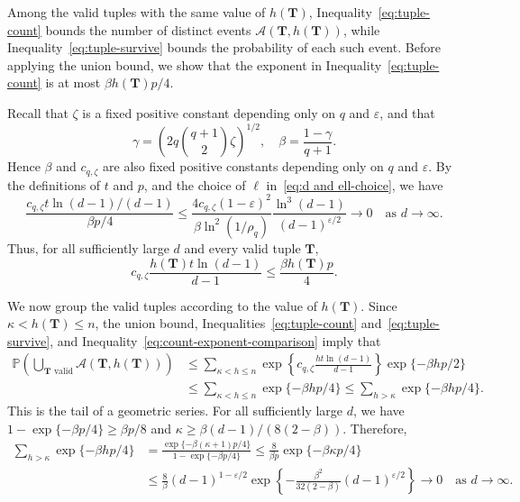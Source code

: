\documentclass[12pt]{article}
\numberwithin{equation}{section}
\theoremstyle{definition}
\newcommand{\Prob}{\mathbb{P}}
\begin{document}
Among the valid tuples with the same value of $h(\mathbf T)$,
Inequality~\eqref{eq:tuple-count} bounds the number of distinct events
$\mathcal A(\mathbf T,h(\mathbf T))$, while
Inequality~\eqref{eq:tuple-survive} bounds the probability of each such
event. Before applying the union bound, we show that the exponent in
Inequality~\eqref{eq:tuple-count} is at most
$\beta h(\mathbf T)p/4$.

Recall that $\zeta$ is a fixed positive constant depending only on $q$ and
$\varepsilon$, and that
\[
 \gamma=\left(2q\binom{q+1}{2}\zeta\right)^{1/2},
 \quad
 \beta=\frac{1-\gamma}{q+1}.
\]
Hence $\beta$ and $c_{q,\zeta}$ are also fixed positive constants depending
only on $q$ and $\varepsilon$. By the definitions of $t$ and $p$, and the
choice of $\ell$ in~\eqref{eq:d and ell-choice}, we have
\[
 \frac{c_{q,\zeta}t\ln(d-1)/(d-1)}{\beta p/4}
 \leq
 \frac{4c_{q,\zeta}(1-\varepsilon)^2}
 {\beta\ln^2(1/\rho_q)}
 \frac{\ln^3(d-1)}{(d-1)^{\varepsilon/2}}
 \longrightarrow 0
 \quad\text{as }d\to\infty.
\]
Thus, for all sufficiently large $d$ and every valid tuple $\mathbf T$,
\begin{equation}\label{eq:count-exponent-comparison}
 c_{q,\zeta}\frac{h(\mathbf T)t\ln(d-1)}{d-1}
 \leq\frac{\beta h(\mathbf T)p}{4}.
\end{equation}

We now group the valid tuples according to the value of $h(\mathbf T)$.
Since $\kappa<h(\mathbf T)\leq n$, the union bound,
Inequalities~\eqref{eq:tuple-count} and~\eqref{eq:tuple-survive}, and
Inequality~\eqref{eq:count-exponent-comparison} imply that
\[
 \begin{aligned}
 \Prob\left(\bigcup_{\mathbf T\text{ valid}}
 \mathcal A(\mathbf T,h(\mathbf T))\right)
 &\leq \sum_{\kappa<h\leq n}
 \exp\left\{c_{q,\zeta}\frac{ht\ln(d-1)}{d-1}\right\}
 \exp\{-\beta hp/2\}\\
 &\leq \sum_{\kappa<h\leq n}\exp\{-\beta hp/4\}
 \leq \sum_{h>\kappa}\exp\{-\beta hp/4\}.
 \end{aligned}
\]
This is the tail of a geometric series. For all sufficiently large $d$, we
have $1 - \exp\{-\beta p/4\} \geq \beta p/8$ and
$\kappa \geq \beta(d - 1)/(8(2 - \beta))$. Therefore,
\[
 \begin{aligned}
 \sum_{h > \kappa}\exp\{-\beta h p/4\}
 &= \frac{\exp\{-\beta(\kappa + 1)p/4\}}
 {1 - \exp\{-\beta p/4\}}
 \leq \frac{8}{\beta p}\exp\{-\beta\kappa p/4\}\\
 & \leq \frac{8}{\beta}(d - 1)^{1 - \varepsilon/2}
 \exp\left\{-\frac{\beta^2}{32(2 - \beta)}
 (d - 1)^{\varepsilon/2}\right\} \longrightarrow 0
 \quad\text{as }d\to\infty.
 \end{aligned}
\]
\end{document}
